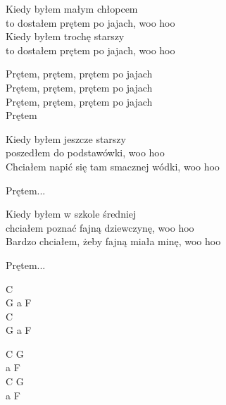 \begin{text} 
    Kiedy byłem małym chłopcem\\
	to dostałem prętem po jajach, woo hoo\\
    Kiedy byłem trochę starszy\\
	to dostałem prętem po jajach, woo hoo

    \vin Prętem, prętem, prętem po jajach\\
    \vin Prętem, prętem, prętem po jajach\\
    \vin Prętem, prętem, prętem po jajach\\
    \vin Prętem

    Kiedy byłem jeszcze starszy\\
	poszedłem do podstawówki, woo hoo\\
    Chciałem napić się tam smacznej wódki, woo hoo

    \vin Prętem...

    Kiedy byłem w szkole średniej\\
	chciałem poznać fajną dziewczynę, woo hoo\\
    Bardzo chciałem, żeby fajną miała minę, woo hoo

    \vin Prętem...

\end{text}
\begin{chord}
    C\\
	G a F \\
    C\\
	G a F 

    C G\\ 
    a F\\
    C G \\
    a F
\end{chord}